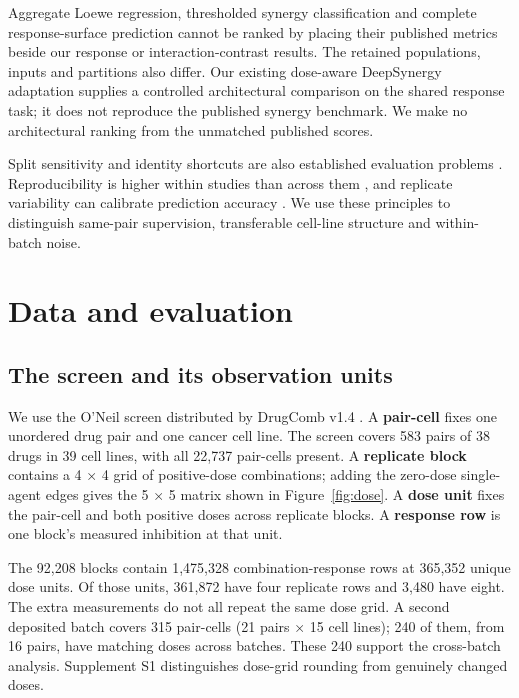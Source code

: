 \documentclass[11pt]{article}
\begin{document}
Aggregate Loewe regression, thresholded synergy classification and complete response-surface prediction cannot be ranked by placing their published metrics beside our response or interaction-contrast results. The retained populations, inputs and partitions also differ. Our existing dose-aware DeepSynergy adaptation supplies a controlled architectural comparison on the shared response task; it does not reproduce the published synergy benchmark. We make no architectural ranking from the unmatched published scores.

Split sensitivity and identity shortcuts are also established evaluation problems \citep{park2012,bernett2024,candir2026,tasnina2025}. Reproducibility is higher within studies than across them \citep{zhang2023harmonizing}, and replicate variability can calibrate prediction accuracy \citep{lagecastellanos2019,schoppe2016}. We use these principles to distinguish same-pair supervision, transferable cell-line structure and within-batch noise.

\section{Data and evaluation}\label{sec:data}
\subsection{The screen and its observation units}
We use the O'Neil screen \citep{oneil2016} distributed by DrugComb v1.4 \citep{zheng2021}. A \textbf{pair-cell} fixes one unordered drug pair and one cancer cell line. The screen covers 583 pairs of 38 drugs in 39 cell lines, with all 22,737 pair-cells present. A \textbf{replicate block} contains a 4 × 4 grid of positive-dose combinations; adding the zero-dose single-agent edges gives the 5 × 5 matrix shown in Figure~\ref{fig:dose}. A \textbf{dose unit} fixes the pair-cell and both positive doses across replicate blocks. A \textbf{response row} is one block's measured inhibition at that unit.

The 92,208 blocks contain 1,475,328 combination-response rows at 365,352 unique dose units. Of those units, 361,872 have four replicate rows and 3,480 have eight. The extra measurements do not all repeat the same dose grid. A second deposited batch covers 315 pair-cells (21 pairs × 15 cell lines); 240 of them, from 16 pairs, have matching doses across batches. These 240 support the cross-batch analysis. Supplement S1 distinguishes dose-grid rounding from genuinely changed doses.
\end{document}
